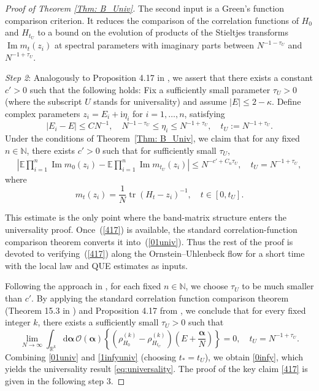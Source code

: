 \documentclass[10pt,reqno]{article}
\theoremstyle{plain} %
\theoremstyle{remark}
\numberwithin{equation}{section}
\begin{document}
\begin{proof}[Proof of Theorem \ref{Thm: B_Univ}]
\begingroup 
The second input is a Green's function comparison criterion.  It reduces the
comparison of the correlation functions of \(H_0\) and \(H_{t_U}\) to a bound
on the evolution of products of the Stieltjes transforms
\(\operatorname{Im}m_t(z_i)\) at spectral parameters with imaginary parts
between \(N^{-1-\tau_U}\) and \(N^{-1+\tau_U}\).
\par\endgroup


\medskip 
\noindent 
\emph{Step 2}: Analogously to Proposition 4.17 in \cite{Xu:2024aa}, we assert that there exists a constant $c'>0$ such that the following holds:
Fix a sufficiently small parameter $\tau_U>0$ (where the subscript $U$ stands for universality) and assume $|E| \leq 2-\kappa$. Define complex parameters $z_i=E_i+\mathrm{i}\eta_i$ for $i=1,\dots,n$, satisfying
\begin{equation}\label{qkhzle23}
|E_i - E| \leq C N^{-1},\quad N^{-1-\tau_U} \leq \eta_i \leq N^{-1+\tau_U},\quad t_U:=N^{-1+\tau_U}.
\end{equation}
Under the conditions of Theorem~\ref{Thm: B_Univ}, we claim that for any fixed $n \in \mathbb{N}$, there exists $c'>0$ such that for sufficiently small $\tau_U$,
\begin{align}\label{417}
\left|\mathbb{E} \prod_{i=1}^n \operatorname{Im} m_0(z_i) - \mathbb{E} \prod_{i=1}^n \operatorname{Im} m_{t_U}(z_i)\right| \leq N^{-c'+C_n \tau_U},\quad t_U=N^{-1+\tau_U},
\end{align}
where
\[
m_t(z_i)= \frac{1}{N}\operatorname{tr}(H_t-z_i)^{-1}, \quad t\in [0, t_U].
\]

\begingroup
This estimate is the only point where the  band-matrix structure enters
the universality proof.  Once~(\ref*{417}) is available, the standard
correlation-function comparison theorem converts it into~(\ref*{01univ}).
Thus the rest of the proof is devoted to verifying~(\ref*{417})  along the  Ornstein--Uhlenbeck flow for a short time with  the 
local law and  QUE estimates as inputs. 
\par\endgroup

Following the approach in \cite{Xu:2024aa}, for each fixed $n \in \mathbb{N}$, we choose $\tau_U$ to be much smaller than $c'$. By applying the standard correlation function comparison theorem (Theorem 15.3 in \cite{erdHos2017dynamical}) and Proposition 4.17 from \cite{Xu:2024aa}, we conclude that for every fixed integer $k$, there exists a sufficiently small $\tau_U>0$ such that
\begin{equation}\label{01univ}
\lim_{N \rightarrow \infty} \int_{\mathbb{R}^k} \mathrm{d}\boldsymbol{\alpha}\,\mathcal{O}(\boldsymbol{\alpha})\left\{\left(\rho_{H_0}^{(k)}-\rho_{H_{t_U}}^{(k)}\right)\left(E+\frac{\boldsymbol{\alpha}}{N}\right)\right\}=0, \quad t_U=N^{-1+\tau_U}.
\end{equation}
Combining \eqref{01univ} and \eqref{1infyuniv} (choosing $t_*=t_U$), we obtain \eqref{0infy}, which yields the universality result \eqref{eq:universality}. The proof of the key claim \eqref{417} is given  in the following step 3.



\end{proof}
\end{document}
